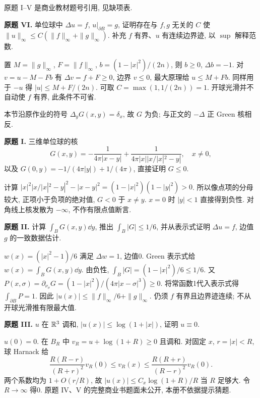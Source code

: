 原题 I--V 是商业教材题号引用, 见缺项表.
\begin{exercise}\label{ps:4VI}
\textbf{原题 VI.} 单位球中 $\Delta u=f$, $u|_{\partial B}=g$, 证明存在与 $f,g$ 无关的 $C$ 使 $\|u\|_\infty\le C(\|f\|_\infty+\|g\|_\infty)$. 补充 $f$ 有界、$u$ 有连续边界迹, 以 $\sup$ 解释范数.
\end{exercise}
\begin{solution}
置 $M=\|g\|_\infty$, $F=\|f\|_\infty$, $b=(1-|x|^2)/(2n)$, 则 $b\ge0$, $\Delta b=-1$. 对 $v=u-M-Fb$ 有 $\Delta v=f+F\ge0$, 边界 $v\le0$, 最大原理给 $u\le M+Fb$. 同样用于 $-u$ 得 $|u|\le M+F/(2n)$. 可取 $C=\max(1,1/(2n))=1$. 开球光滑并不自动使 $f$ 有界, 此条件不可省.
\end{solution}
本节沿原作业的符号 $\Delta_yG(x,y)=\delta_x$, 故 $G$ 为负; 与正文的 $-\Delta$ 正 Green 核相反.
\begin{exercise}\label{ps:5I}
\textbf{原题 I.} 三维单位球的核
\[
G(x,y)=-\frac1{4\pi|x-y|}+\frac1{4\pi|x||x/|x|^2-y|},\quad x\ne0,
\]
以及 $G(0,y)=-1/(4\pi|y|)+1/(4\pi)$, 直接证明 $G\le0$.
\end{exercise}
\begin{solution}
计算 $|x|^2|x/|x|^2-y|^2-|x-y|^2=(1-|x|^2)(1-|y|^2)>0$. 所以像点项的分母较大, 正项小于负项的绝对值, $G<0$ 于 $x\ne y$. $x=0$ 时 $|y|<1$ 直接得到负性. 对角线上核发散为 $-\infty$, 不作有限点值断言.
\end{solution}
\begin{exercise}\label{ps:5II}
\textbf{原题 II.} 计算 $\int_B G(x,y)\dd y$, 推出 $\int_B|G|\le1/6$, 并从表示式证明 $\Delta u=f$, 边值 $g$ 的一致数据估计.
\end{exercise}
\begin{solution}
$w(x)=(|x|^2-1)/6$ 满足 $\Delta w=1$, 边值0. Green 表示式给 $w(x)=\int_BG(x,y)\dd y$. 由负性,
$\int_B|G|=(1-|x|^2)/6\le1/6$. 又 $P(x,\sigma)=\partial_{\nu_\sigma}G=(1-|x|^2)/(4\pi|x-\sigma|^3)\ge0$. 将常函数1代入表示式得 $\int_{\partial B}P=1$. 因此
$|u(x)|\le\|f\|_\infty/6+\|g\|_\infty$. 仍须 $f$ 有界且边界迹连续; 不从开球光滑推有限最大值.
\end{solution}
\begin{exercise}\label{ps:5III}
\textbf{原题 III.} $u$ 在 $\mathbb R^3$ 调和, $|u(x)|\le\log(1+|x|)$, 证明 $u\equiv0$.
\end{exercise}
\begin{solution}
$u(0)=0$. 在 $B_R$ 中 $v_R=u+\log(1+R)\ge0$ 且调和. 对固定 $x$, $r=|x|<R$, 球 Harnack 给
\[
\frac{R(R-r)}{(R+r)^2}v_R(0)\le v_R(x)\le
\frac{R(R+r)}{(R-r)^2}v_R(0).
\]
两个系数均为 $1+O(r/R)$, 故 $|u(x)|\le C_x\log(1+R)/R$ 当 $R$ 足够大. 令 $R\to\infty$ 得0. 原题 IV、V 的完整商业书题面未公开, 本册不依据提示猜题.
\end{solution}
